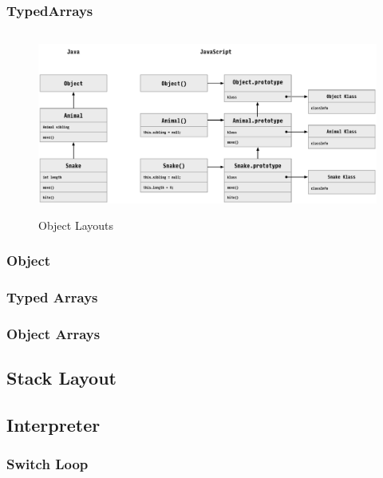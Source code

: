 \documentclass{acm_proc_article-sp}
\begin{document}
\subsubsection{TypedArrays}


\begin{figure}[]
\begin{center}
\includegraphics[height=6cm]{objects.pdf}
\caption{Object Layouts}
\label{fig:objects}
\end{center}
\end{figure}

\subsubsection{Object}

\subsubsection{Typed Arrays}

\subsubsection{Object Arrays}

\subsection{Stack Layout}

\subsection{Interpreter}

\subsubsection{Switch Loop}
\end{document}
